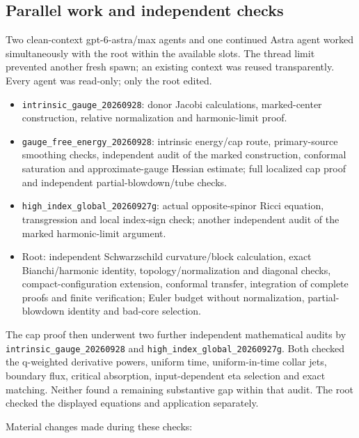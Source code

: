 \documentclass[
  10pt,
]{article}
\providecommand{\tightlist}{%
  \setlength{\itemsep}{0pt}\setlength{\parskip}{0pt}}
\begin{document}
\hypertarget{parallel-work-and-independent-checks}{%
\subsection{Parallel work and independent
checks}\label{parallel-work-and-independent-checks}}

Two clean-context gpt-6-astra/max agents and one continued Astra agent
worked simultaneously with the root within the available slots. The
thread limit prevented another fresh spawn; an existing context was
reused transparently. Every agent was read-only; only the root edited.

\begin{itemize}
\tightlist
\item
  \nolinkurl{intrinsic_gauge_20260928}: donor Jacobi calculations, marked-center
  construction, relative normalization and harmonic-limit proof.
\item
  \nolinkurl{gauge_free_energy_20260928}: intrinsic energy/cap route,
  primary-source smoothing checks, independent audit of the marked
  construction, conformal saturation and approximate-gauge Hessian
  estimate; full localized cap proof and independent
  partial-blowdown/tube checks.
\item
  \nolinkurl{high_index_global_20260927g}: actual opposite-spinor Ricci equation,
  transgression and local index-sign check; another independent audit of
  the marked harmonic-limit argument.
\item
  Root: independent Schwarzschild curvature/block calculation, exact
  Bianchi/harmonic identity, topology/normalization and diagonal checks,
  compact-configuration extension, conformal transfer, integration of
  complete proofs and finite verification; Euler budget without
  normalization, partial-blowdown identity and bad-core selection.
\end{itemize}

The cap proof then underwent two further independent mathematical audits
by \nolinkurl{intrinsic_gauge_20260928} and \nolinkurl{high_index_global_20260927g}. Both
checked the q-weighted derivative powers, uniform time, uniform-in-time
collar jets, boundary flux, critical absorption, input-dependent eta
selection and exact matching. Neither found a remaining substantive gap
within that audit. The root checked the displayed equations and
application separately.

Material changes made during these checks:
\end{document}
